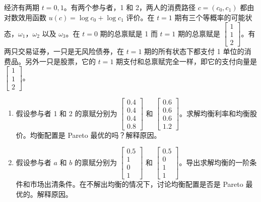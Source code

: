 
\par\noindent\begin{minipage}{\linewidth}
\begin{problem}
 经济有两期 $t=0,1$。有两个参与者，1 和 2，两人的消费路径 $c=(c_0,c_1)$ 都由对数效用函数 $u(c)=\log c_0+\log c_1$ 评价。在 $t=1$ 期有三个等概率的可能状态，$\omega_{1}$，$\omega_{2}$ 以及 $\omega_{3}$。在 $t=0$ 期的总禀赋是 1 而 $t=1$ 期的总禀赋是 $\begin{bmatrix}1 \\ 1 \\ 2\end{bmatrix}$。有两只交易证券，一只是无风险债券，在 $t=1$ 期的所有状态下都支付 1 单位的消费品。另外一只是股票，它的 $t=1$ 期支付和总禀赋完全一样，即它的支付向量是 $\begin{bmatrix}1 \\ 1 \\ 2\end{bmatrix}$。
\begin{enumerate}[label=(\alph*)]
    \item 假设参与者 1 和 2 的禀赋分别为 $\begin{bmatrix}0.4\\0.4\\0.4\\0.8\end{bmatrix}$ 和 $\begin{bmatrix}0.6\\0.6\\0.6\\1.2\end{bmatrix}$。求解均衡利率和均衡股价。均衡配置是 Pareto 最优的吗？解释原因。
    \item 假设参与者 $a$ 和 $b$ 的禀赋分别为 $\begin{bmatrix}0.5\\1\\0\\1\end{bmatrix}$ 和 $\begin{bmatrix}0.5\\0\\1\\1\end{bmatrix}$。导出求解均衡的一阶条件和市场出清条件。在不解出均衡的情况下，讨论均衡配置是否是 Pareto 最优的。解释原因。
\end{enumerate}
\end{problem}
\end{minipage}\par
